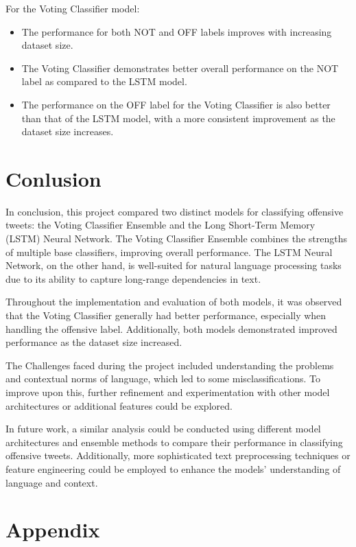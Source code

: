 \documentclass[11pt]{article}
\begin{document}
For the Voting Classifier model:
\begin{itemize}
\item The performance for both NOT and OFF labels improves with increasing dataset size.
\item The Voting Classifier demonstrates better overall performance on the NOT label as compared to the LSTM model.
\item The performance on the OFF label for the Voting Classifier is also better than that of the LSTM model, with a more consistent improvement as the dataset size increases.
\end{itemize}





\section{Conlusion}

In conclusion, this project compared two distinct models for classifying offensive tweets: the Voting Classifier Ensemble and the Long Short-Term Memory (LSTM) Neural Network. The Voting Classifier Ensemble combines the strengths of multiple base classifiers, improving overall performance. The LSTM Neural Network, on the other hand, is well-suited for natural language processing tasks due to its ability to capture long-range dependencies in text.

Throughout the implementation and evaluation of both models, it was observed that the Voting Classifier generally had better performance, especially when handling the offensive label. Additionally, both models demonstrated improved performance as the dataset size increased.

The Challenges faced during the project included understanding the problems and contextual norms of language, which led to some misclassifications. To improve upon this, further refinement and experimentation with other model architectures or additional features could be explored.

In future work, a similar analysis could be conducted using different model architectures and ensemble methods to compare their performance in classifying offensive tweets. Additionally, more sophisticated text preprocessing techniques or feature engineering could be employed to enhance the models' understanding of language and context.
\pagebreak
\pagebreak

\appendix

\section{Appendix}
\end{document}
